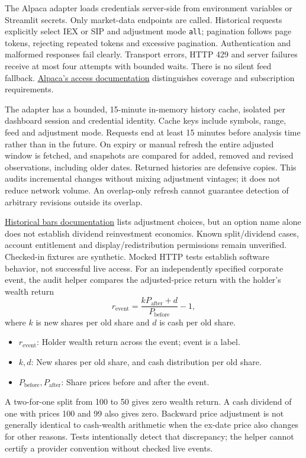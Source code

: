 \documentclass[
  american,
  11pt,
]{article}
\begin{document}
The Alpaca adapter loads credentials server-side from environment
variables or Streamlit secrets. Only market-data endpoints are called.
Historical requests explicitly select IEX or SIP and adjustment mode
\texttt{all}; pagination follows page tokens, rejecting repeated tokens
and excessive pagination. Authentication and malformed responses fail
clearly. Transport errors, HTTP 429 and server failures receive at most
four attempts with bounded waits. There is no silent feed fallback.
\href{https://docs.alpaca.markets/us/docs/about-market-data-api}{Alpaca's
access documentation} distinguishes coverage and subscription
requirements.

The adapter has a bounded, 15-minute in-memory history cache, isolated
per dashboard session and credential identity. Cache keys include symbols,
range, feed and adjustment mode. Requests end at least 15 minutes before
analysis time rather than in the future. On expiry or manual refresh the
entire adjusted window is fetched, and snapshots are compared for added,
removed and revised observations, including older dates. Returned histories
are defensive copies. This audits incremental changes without mixing
adjustment vintages; it does not reduce network volume. An overlap-only
refresh cannot guarantee detection of arbitrary revisions outside its overlap.

\href{https://docs.alpaca.markets/us/reference/stockbars}{Historical
bars documentation} lists adjustment choices, but an option name alone
does not establish dividend reinvestment economics. Known split/dividend
cases, account entitlement and display/redistribution permissions remain
unverified. Checked-in fixtures are synthetic. Mocked HTTP tests
establish software behavior, not successful live access. For an independently
specified corporate event, the audit helper compares the adjusted-price return
with the holder's wealth return
\[
r_{\mathrm{event}}=\frac{kP_{\mathrm{after}}+d}{P_{\mathrm{before}}}-1,
\]
where \(k\) is new shares per old share and \(d\) is cash per old share.
\begin{itemize}
\item \(r_{\mathrm{event}}\): Holder wealth return across the event; event is a label.
\item \(k,d\): New shares per old share, and cash distribution per old share.
\item \(P_{\mathrm{before}},P_{\mathrm{after}}\): Share prices before and after the event.
\end{itemize}

A two-for-one split from 100 to 50 gives zero wealth return. A cash dividend
of one with prices 100 and 99 also gives zero. Backward price adjustment
is not generally identical to cash-wealth arithmetic when the ex-date price
also changes for other reasons. Tests intentionally detect that discrepancy;
the helper cannot certify a provider convention without checked live events.
\end{document}
